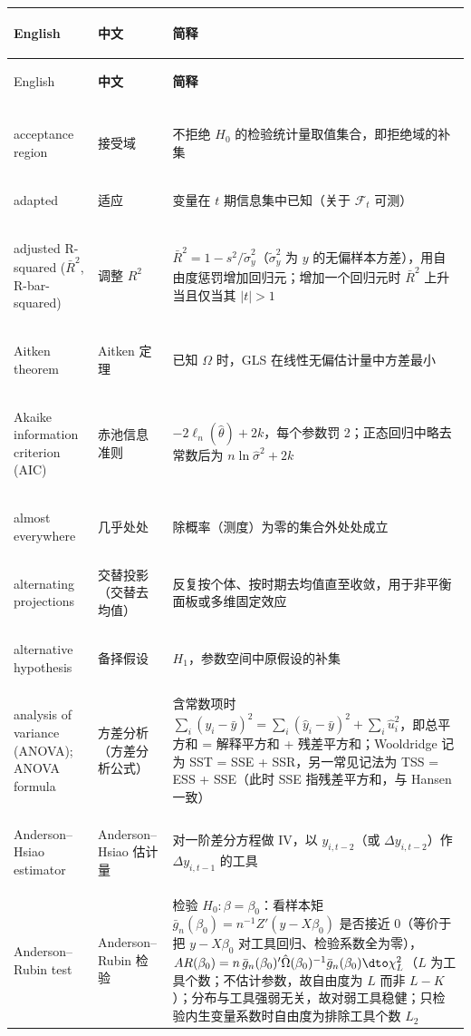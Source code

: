 \begin{longtable}{@{}>{\bfseries\boldmath\raggedright\arraybackslash}p{4.6cm}>{\raggedright\arraybackslash}p{3.2cm}>{\raggedright\arraybackslash}p{\dimexpr\textwidth-7.8cm-4\tabcolsep\relax}@{}}
\toprule
English & \textbf{中文} & \textbf{简释}\\
\midrule
\endfirsthead
\toprule
English & \textbf{中文} & \textbf{简释}\\
\midrule
\endhead
\midrule
\multicolumn{3}{r@{}}{\footnotesize\itshape （续下页）}\\
\endfoot
\bottomrule
\endlastfoot
acceptance region & 接受域 & 不拒绝 $H_0$ 的检验统计量取值集合，即拒绝域的补集 \\
adapted & 适应 & 变量在 $t$ 期信息集中已知（关于 $\mathcal{F}_t$ 可测） \\
adjusted R-squared ($\bar R^2$, R-bar-squared) & 调整 $R^2$ & $\bar R^2=1-s^2/\tilde\sigma_y^2$（$\tilde\sigma_y^2$ 为 $y$ 的无偏样本方差），用自由度惩罚增加回归元；增加一个回归元时 $\bar R^2$ 上升当且仅当其 $|t|>1$ \\
Aitken theorem & Aitken 定理 & 已知 $\Omega$ 时，GLS 在线性无偏估计量中方差最小 \\
Akaike information criterion (AIC) & 赤池信息准则 & $-2\ell_n(\hat\theta)+2k$，每个参数罚 2；正态回归中略去常数后为 $n\ln\hat\sigma^2+2k$ \\
almost everywhere & 几乎处处 & 除概率（测度）为零的集合外处处成立 \\
alternating projections & 交替投影（交替去均值） & 反复按个体、按时期去均值直至收敛，用于非平衡面板或多维固定效应 \\
alternative hypothesis & 备择假设 & $H_1$，参数空间中原假设的补集 \\
analysis of variance (ANOVA); ANOVA formula & 方差分析（方差分析公式） & 含常数项时 $\sum_i(y_i-\bar y)^2=\sum_i(\hat y_i-\bar y)^2+\sum_i\hat u_i^2$，即总平方和 = 解释平方和 + 残差平方和；Wooldridge 记为 SST = SSE + SSR，另一常见记法为 TSS = ESS + SSE（此时 SSE 指残差平方和，与 Hansen 一致） \\
Anderson--Hsiao estimator & Anderson--Hsiao 估计量 & 对一阶差分方程做 IV，以 $y_{i,t-2}$（或 $\Delta y_{i,t-2}$）作 $\Delta y_{i,t-1}$ 的工具 \\
Anderson--Rubin test & Anderson--Rubin 检验 & 检验 $H_0:\beta=\beta_0$：看样本矩 $\bar g_n(\beta_0)=n^{-1}Z'(y-X\beta_0)$ 是否接近 0（等价于把 $y-X\beta_0$ 对工具回归、检验系数全为零），$AR(\beta_0)=n\,\bar g_n(\beta_0)'\hat\Omega(\beta_0)^{-1}\bar g_n(\beta_0)\dto\chi^2_L$（$L$ 为工具个数；不估计参数，故自由度为 $L$ 而非 $L-K$）；分布与工具强弱无关，故对弱工具稳健；只检验内生变量系数时自由度为排除工具个数 $L_2$ \\

\end{longtable}
